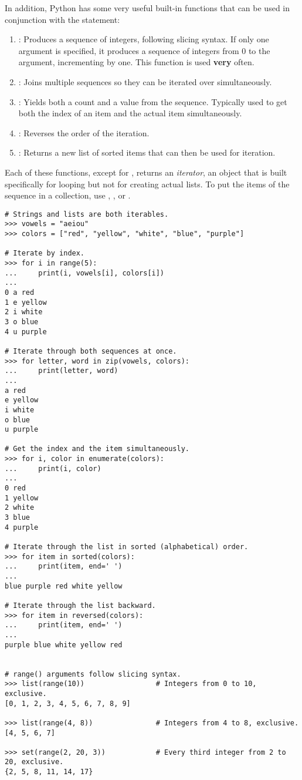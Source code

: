 In addition, Python has some very useful built-in functions that can be used in conjunction with the  statement:
\begin{enumerate}
\item {}: Produces a sequence of integers, following slicing syntax.
If only one argument is specified, it produces a sequence of integers from 0 to the argument, incrementing by one.
This function is used \textbf{very} often.
\item {}: Joins multiple sequences so they can be iterated over simultaneously.
\item {}: Yields both a count and a value from the sequence. Typically used to get both the index of an item and the actual item simultaneously.
\item {}: Reverses the order of the iteration.
\item {}: Returns a new list of sorted items that can then be used for iteration.
\end{enumerate}
Each of these functions, except for , returns an \emph{iterator}, an object that is built specifically for looping but not for creating actual lists.
To put the items of the sequence in a collection, use , , or .

\begin{lstlisting}
# Strings and lists are both iterables.
>>> vowels = "aeiou"
>>> colors = ["red", "yellow", "white", "blue", "purple"]

# Iterate by index.
>>> for i in range(5):
...     print(i, vowels[i], colors[i])
...
0 a red
1 e yellow
2 i white
3 o blue
4 u purple

# Iterate through both sequences at once.
>>> for letter, word in zip(vowels, colors):
...     print(letter, word)
...
a red
e yellow
i white
o blue
u purple

# Get the index and the item simultaneously.
>>> for i, color in enumerate(colors):
...     print(i, color)
...
0 red
1 yellow
2 white
3 blue
4 purple

# Iterate through the list in sorted (alphabetical) order.
>>> for item in sorted(colors):
...     print(item, end=' ')
...
blue purple red white yellow

# Iterate through the list backward.
>>> for item in reversed(colors):
...     print(item, end=' ')
...
purple blue white yellow red


# range() arguments follow slicing syntax.
>>> list(range(10))                 # Integers from 0 to 10, exclusive.
[0, 1, 2, 3, 4, 5, 6, 7, 8, 9]

>>> list(range(4, 8))               # Integers from 4 to 8, exclusive.
[4, 5, 6, 7]

>>> set(range(2, 20, 3))            # Every third integer from 2 to 20, exclusive.
{2, 5, 8, 11, 14, 17}
\end{lstlisting}

